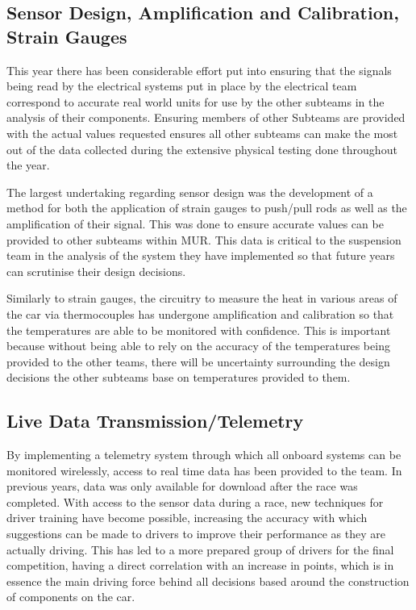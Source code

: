 \subsection{Sensor Design, Amplification and Calibration, Strain Gauges}
This year there has been considerable effort put into ensuring that the signals being read by the electrical systems put in place by the electrical team correspond to accurate real world units for use by the other subteams in the analysis of their components. Ensuring members of other Subteams are provided with the actual values requested ensures all other subteams can make the most out of the data collected during the extensive physical testing done throughout the year. 

The largest undertaking regarding sensor design was the development of a method for both the application of strain gauges to push/pull rods as well as the amplification of their signal. This was done to ensure accurate values can be provided to other subteams within MUR. This data is critical to the suspension team in the analysis of the system they have implemented so that future years can scrutinise their design decisions.

Similarly to strain gauges, the circuitry to measure the heat in various areas of the car via thermocouples has undergone amplification and calibration so that the temperatures are able to be monitored with confidence. This is important because without being able to rely on the accuracy of the temperatures being provided to the other teams, there will be uncertainty surrounding the design decisions the other subteams base on temperatures provided to them.

\subsection{Live Data Transmission/Telemetry}
By implementing a telemetry system through which all onboard systems can be monitored wirelessly, access to real time data has been provided to the team. In previous years, data was only available for download after the race was completed. With access to the sensor data during a race, new techniques for driver training have become possible, increasing the accuracy with which suggestions can be made to drivers to improve their performance as they are actually driving. This has led to a more prepared group of drivers for the final competition, having a direct correlation with an increase in points, which is in essence the main driving force behind all decisions based around the construction of components on the car.


